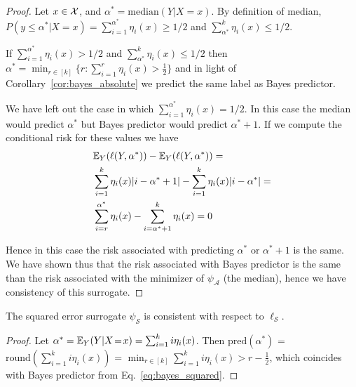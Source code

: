 \begin{proof}
Let $x \in \mathcal{X}$, and $\alpha^* = \mathrm{median}(Y|X\!=\!x)$. By definition of median, $P(y \leq \alpha^* | X\!=\!x) = \sum_{i=1}^{\alpha^*} \eta_i(x) \geq 1/2$ and $\sum_{\alpha^*}^k \eta_i(x) \leq 1/2$.

If $\sum_{i=1}^{\alpha^*} \eta_i(x) > 1/2$ and $\sum_{\alpha^*}^k \eta_i(x) \leq 1/2$ then $\alpha^* = \min_{r \in [k]} \{r : \sum_{i=1}^r \eta_i(x) > \frac{1}{2}\}$ and in light of Corollary~\ref{cor:bayes_absolute} we predict the same label as Bayes predictor.

We have left out the case in which $\sum_{i=1}^{\alpha^*} \eta_i(x) = 1/2$. In this case the median would predict $\alpha^*$ but Bayes predictor would predict $\alpha^* + 1$. If we compute the conditional risk for these values we have
\begin{equation*}
\begin{aligned}
&\mathbb{E}_Y(\ell(Y, \alpha^*)) - \mathbb{E}_Y(\ell(Y, \alpha^*)) = \\
&\sum_{i=1}^k \eta_i(x) |i - \alpha^* + 1| - \sum_{i=1}^k \eta_i(x)|i -\alpha^*| = \\
&\sum_{i=r}^{\alpha^*}\eta_i(x) - \sum_{i = \alpha^* + 1}^k \eta_i(x) = 0
\end{aligned}
\end{equation*}

Hence in this case the risk associated with predicting $\alpha^*$ or $\alpha^* + 1$ is the same. We have shown thus that the risk associated with Bayes predictor is the same than the risk associated with the minimizer of $\psi_{\mathcal{A}}$ (the median), hence we have consistency of this surrogate.

\end{proof}


\begin{theorem}\label{thm:consistent_squared}
The squared error surrogate $\psi_{\mathcal{S}}$ is consistent with respect to $\ell_{\mathcal{S}}$.
\end{theorem}

\begin{proof}
Let $\alpha^* = \mathbb{E}_Y(Y|X\!=\!x) = \sum_{i=1}^k i \eta_i(x)$. Then $\text{pred}(\alpha^*)$ = $\text{round}\left(\sum_{i=1}^k i \eta_i(x) \right)$ = $\min_{r \in [k]} \sum_{i=1}^k i \eta_i(x) > r - \frac{1}{2}$,  which coincides with Bayes predictor from Eq.~\eqref{eq:bayes_squared}.
\end{proof}

